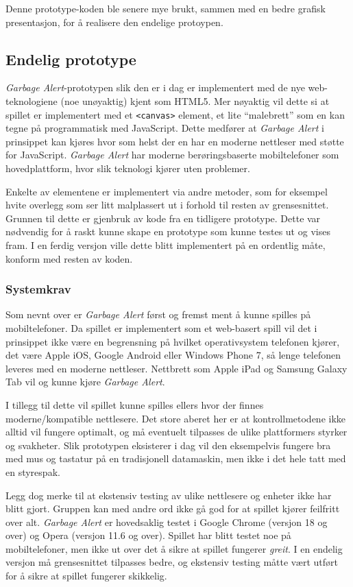 Denne prototype-koden ble senere mye brukt, sammen med en bedre grafisk
presentasjon, for å realisere den endelige protoypen.

\subsection{Endelig prototype}
\emph{Garbage Alert}-prototypen slik den er i dag er implementert med de nye
web-teknologiene (noe unøyaktig) kjent som HTML5. Mer nøyaktig vil dette
si at spillet er implementert med et \texttt{<canvas>} element, et lite
``malebrett'' som en kan tegne på programmatisk med JavaScript. Dette
medfører at \emph{Garbage Alert} i prinsippet kan kjøres hvor som helst der en
har en moderne nettleser med støtte for JavaScript. \emph{Garbage Alert} har
moderne berøringsbaserte mobiltelefoner som hovedplattform, hvor slik
teknologi kjører uten problemer.

Enkelte av elementene er implementert via andre metoder, som for
eksempel hvite overlegg som ser litt malplassert ut i forhold til resten
av grensesnittet. Grunnen til dette er gjenbruk av kode fra en tidligere
prototype. Dette var nødvendig for å raskt kunne skape en prototype som
kunne testes ut og vises fram. I en ferdig versjon ville dette blitt
implementert på en ordentlig måte, konform med resten av koden.


\subsubsection{Systemkrav}
Som nevnt over er \emph{Garbage Alert} først og fremst ment å kunne spilles på
mobiltelefoner.
Da spillet er implementert som et web-basert spill vil det i prinsippet
ikke være en begrensning på hvilket operativsystem telefonen kjører, det
være Apple iOS, Google Android eller Windows Phone 7, så lenge telefonen
leveres med en moderne nettleser. Nettbrett som Apple iPad og Samsung
Galaxy Tab vil og kunne kjøre \emph{Garbage Alert}.

I tillegg til dette vil spillet kunne spilles ellers hvor der finnes
moderne/kompatible nettlesere. Det store aberet her er at
kontrollmetodene ikke alltid vil fungere optimalt, og må eventuelt
tilpasses de ulike plattformers styrker og svakheter. Slik prototypen
eksisterer i dag vil den eksempelvis fungere bra med mus og tastatur på
en tradisjonell datamaskin, men ikke i det hele tatt med en styrespak.

Legg dog merke til at ekstensiv testing av ulike nettlesere og enheter
ikke har blitt gjort. Gruppen kan med andre ord ikke gå god for at
spillet kjører feilfritt over alt. \emph{Garbage Alert} er hovedsaklig testet i
Google Chrome (versjon 18 og over) og Opera (versjon 11.6 og over).
Spillet har blitt testet noe på mobiltelefoner, men ikke ut over det å
sikre at spillet fungerer \emph{greit}. I en endelig versjon må
grensesnittet tilpasses bedre, og ekstensiv testing måtte vært utført
for å sikre at spillet fungerer skikkelig.

